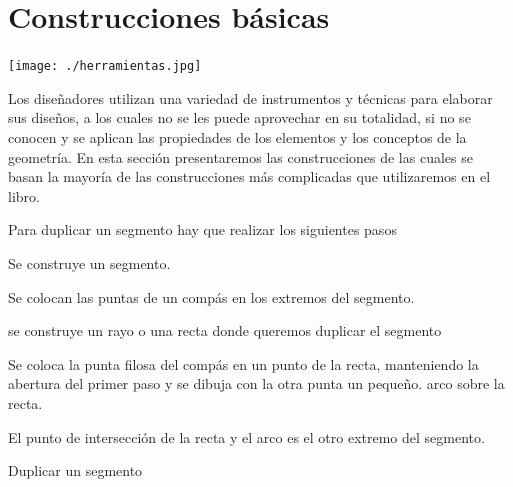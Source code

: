 \documentclass[12pt]{book}
\begin{document}
\section{Construcciones básicas}
\label{sec:3}
\begin{floatingfigure}{4cm}
 \texttt{[image: ./herramientas.jpg]}
\end{floatingfigure}
Los diseñadores utilizan una variedad de instrumentos y técnicas para
elaborar sus diseños, a los cuales no se les puede aprovechar en su totalidad,
si no se conocen y se aplican las propiedades de los elementos  y los conceptos
de la geometría.
\vskip 10pt
En esta sección presentaremos las construcciones de las cuales se basan la
mayoría
 de las construcciones más complicadas que utilizaremos en el libro.
\begin{construccion}{Para duplicar un segmento hay que realizar los siguientes pasos
\begin{lista}
 \item Se construye un segmento.
 \item  Se colocan las puntas de un compás en los extremos del segmento.
 \item se construye un rayo o una recta donde queremos duplicar el segmento
 \item Se coloca la punta filosa del compás en un punto de la recta, manteniendo la abertura del primer
  paso y se dibuja  con la otra punta un peque\~no. arco sobre la recta.
  \item El punto de intersección de la recta y el arco es el otro extremo del segmento.
\end{lista}
}{Duplicar un segmento}
\end{construccion}
\end{document}
